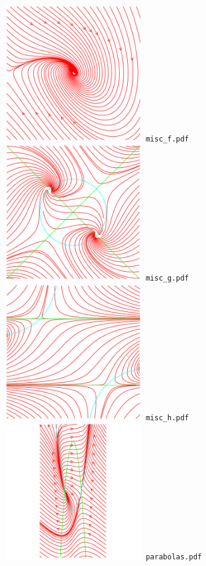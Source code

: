 \documentclass[a4paper]{amsart}
\begin{document}
\includegraphics[width=6cm]{misc_f.pdf}\verb+ misc_f.pdf+\\
\includegraphics[width=6cm]{misc_g.pdf}\verb+ misc_g.pdf+\\
\includegraphics[width=6cm]{misc_h.pdf}\verb+ misc_h.pdf+\\
\includegraphics[width=6cm]{parabolas.pdf}\verb+ parabolas.pdf+\\
\end{document}
